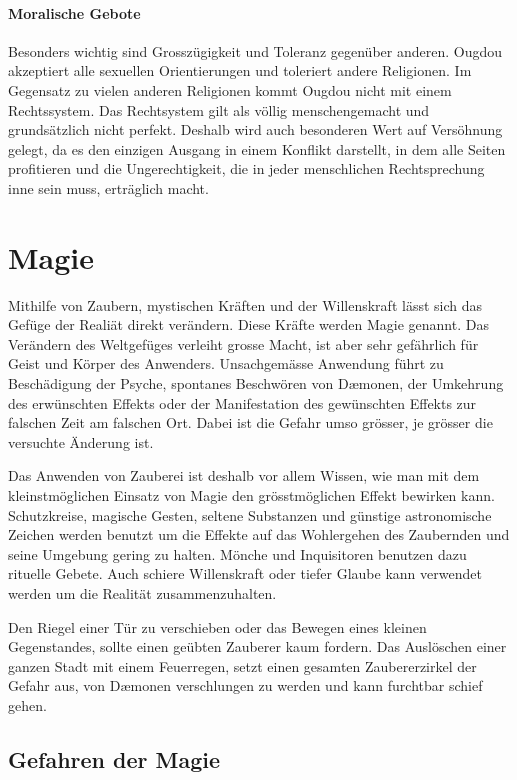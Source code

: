 \documentclass[12pt,twoside,twocolumn,openany]{book}
\begin{document}
\subsubsection{Moralische Gebote}
Besonders wichtig sind Grosszügigkeit und Toleranz gegenüber anderen. Ougdou akzeptiert alle sexuellen Orientierungen und toleriert andere Religionen. Im Gegensatz zu vielen anderen Religionen kommt Ougdou nicht mit einem Rechtssystem. Das Rechtsystem gilt als völlig menschengemacht und grundsätzlich nicht perfekt. Deshalb wird auch besonderen Wert auf Versöhnung gelegt, da es den einzigen Ausgang in einem Konflikt darstellt, in dem alle Seiten profitieren und die Ungerechtigkeit, die in jeder menschlichen Rechtsprechung inne sein muss, erträglich macht.


\chapter{Magie}

Mithilfe von Zaubern, mystischen Kräften und der Willenskraft lässt sich das Gefüge der Realiät direkt verändern. Diese Kräfte werden Magie genannt. Das Verändern des Weltgefüges verleiht grosse Macht, ist aber sehr gefährlich für Geist und Körper des Anwenders. Unsachgemässe Anwendung führt zu Beschädigung der Psyche, spontanes Beschwören von D\ae monen, der Umkehrung des erwünschten Effekts oder der Manifestation des gewünschten Effekts zur falschen Zeit am falschen Ort. Dabei ist die Gefahr umso grösser, je grösser die versuchte Änderung ist.

Das Anwenden von Zauberei ist deshalb vor allem Wissen, wie man mit dem kleinstmöglichen Einsatz von Magie den grösstmöglichen Effekt bewirken kann. Schutzkreise, magische Gesten, seltene Substanzen und günstige astronomische Zeichen werden benutzt um die Effekte auf das Wohlergehen des Zaubernden und seine Umgebung gering zu halten. Mönche und Inquisitoren benutzen dazu rituelle Gebete. Auch schiere Willenskraft oder tiefer Glaube kann verwendet werden um die Realität zusammenzuhalten.

Den Riegel einer Tür zu verschieben oder das Bewegen eines kleinen Gegenstandes, sollte einen geübten Zauberer kaum fordern. Das Auslöschen einer ganzen Stadt mit einem Feuerregen, setzt einen gesamten Zaubererzirkel der Gefahr aus, von D\ae monen verschlungen zu werden und kann furchtbar schief gehen.



\section{Gefahren der Magie}
\end{document}
